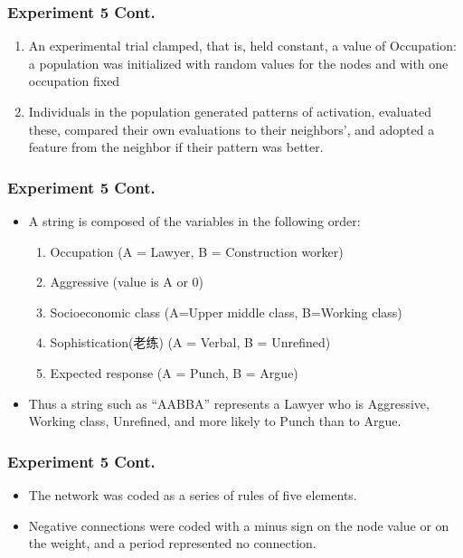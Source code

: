 \documentclass[CJK]{beamer}
\begin{document}
\begin{CJK*}{GBK}{song}
\begin{frame}
\frametitle{Experiment 5 Cont.}
\begin{enumerate}
\item{An experimental trial clamped, that is, held constant, a value of Occupation:
a population was initialized with random values for the nodes
and with one occupation fixed}
\item{Individuals in the population generated patterns of activation,
evaluated these, compared their own evaluations to their neighbors’,
and adopted a feature from the neighbor if their pattern was better.}
\end{enumerate}
\end{frame}

\begin{frame}
\frametitle{Experiment 5 Cont.}
\begin{itemize}
\item{A string is composed of the variables in the following order:}
\begin{enumerate}
\item{Occupation (A = Lawyer, B = Construction worker)}
\item{Aggressive (value is A or 0)}
\item{Socioeconomic class (A=Upper middle class, B=Working class)}
\item{Sophistication(老练) (A = Verbal, B = Unrefined)}
\item{Expected response (A = Punch, B = Argue)}
\end{enumerate}
\item{Thus a string such as “AABBA” represents a Lawyer who is Aggressive,
Working class, Unrefined, and more likely to Punch than to Argue.}
\end{itemize}
\end{frame}

\begin{frame}
\frametitle{Experiment 5 Cont.}
\begin{itemize}
\item{The network was coded as a series of rules of five elements.}
\item{Negative
connections were coded with a minus sign on the node value or on the
weight, and a period represented no connection.}
\end{itemize}
\end{frame}


\end{CJK*}
\end{document}

